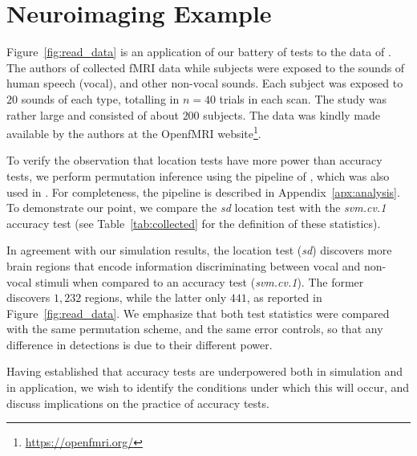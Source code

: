 \documentclass[12pt,a4paper]{article}
\begin{document}
\section{Neuroimaging Example}
\label{sec:example}

Figure~\ref{fig:read_data} is an application of our battery of tests to the data of \cite{pernet_human_2015}. 
The authors of \cite{pernet_human_2015} collected fMRI data while subjects were exposed to the sounds of human speech (vocal), and other non-vocal sounds. 
Each subject was exposed to $20$ sounds of each type, totalling in $n=40$ trials in each scan.
The study was rather large and consisted of about $200$ subjects.
The data was kindly made available by the authors at the OpenfMRI website\footnote{\url{https://openfmri.org/}}.

To verify the observation that location tests have more power than accuracy tests, we perform permutation inference using the pipeline of \cite{stelzer_statistical_2013}, which was also used in \cite{gilron_quantifying_2016}. 
For completeness, the pipeline is described in Appendix~\ref{apx:analysis}. 
To demonstrate our point, we compare the \emph{sd} location test with the \emph{svm.cv.1} accuracy test (see Table~\ref{tab:collected} for the definition of these statistics). 

In agreement with our simulation results, the location test (\emph{sd}) discovers more brain regions that encode information discriminating between vocal and non-vocal stimuli when compared to an accuracy test (\emph{svm.cv.1}).
The former discovers $1,232$ regions, while the latter only $441$, as reported in Figure~\ref{fig:read_data}.
We emphasize that both test statistics were compared with the same permutation scheme, and the same error controls, so that any difference in detections is due to their different power.

Having established that accuracy tests are underpowered both in simulation and in application, we wish to identify the conditions under which this will occur, and discuss implications on the practice of accuracy tests. 
\end{document}
